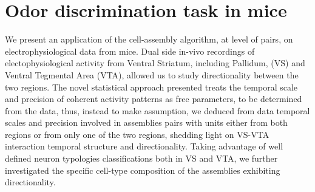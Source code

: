 \chapter{Odor discrimination task in mice}
\label{chap:MaxData}
We present an application of the cell-assembly algorithm, at level of pairs, on electrophysiological data from mice.
Dual side in-vivo recordings of electophysiological activity from Ventral Striatum, including Pallidum, (VS) and Ventral Tegmental Area (VTA), allowed us to study directionality between the two regions.
The novel statistical approach presented treats the temporal scale and precision of coherent activity patterns as free parameters, to be determined from the data, thus, instead to make assumption, we deduced from data temporal scales and precision involved in assemblies pairs with units either from both regions or from only one of the two regions, shedding light on VS-VTA interaction temporal structure and directionality.
Taking advantage of well defined neuron typologies classifications both in VS and VTA, we further investigated the specific cell-type composition of the assemblies exhibiting directionality. 
